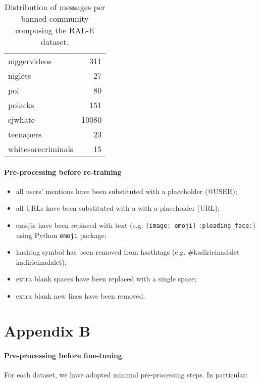 \documentclass[11pt]{article}
\begin{document}
\begin{table}[!tbh]
\begin{tabular}{lr}
niggervideos        &        311 \\
niglets             &         27 \\
pol                 &         80 \\
polacks             &        151 \\
sjwhate             &      10080 \\
teenapers           &         23 \\
whitesarecriminals      &     15 \\
    \end{tabular}
    \caption{Distribution of messages per banned community composing the RAL-E dataset.}
    \label{tab:rale}
\end{table}


\paragraph{Pre-processing before re-training}

\begin{itemize}
    \item all users' mentions have been substituted with a placeholder (@USER);
    \item all URLs have been substituted with a with a placeholder (URL);
    \item emojis have been replaced with text (e.g. \texttt{[image: emoji]}  \texttt{:pleading\_face:}) using Python \texttt{emoji} package;
    \item hashtag symbol has been removed from hasthtags (e.g. \#kadiricinadalet  kadiricinadalet);
    \item extra blank spaces have been replaced with a single space;
    \item extra blank new lines have been removed.
\end{itemize}










\section*{Appendix B}

\paragraph{Pre-processing before fine-tuning} For each dataset, we have adopted minimal pre-processing steps. In particular:
\end{document}
